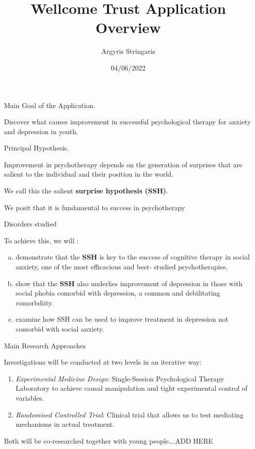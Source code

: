 \documentclass[
  ignorenonframetext,
]{beamer}
\title{Wellcome Trust Application Overview}
\author{Argyris Stringaris}
\date{04/06/2022}
\begin{document}
\frame{\titlepage}

\begin{frame}{Main Goal of the Application.}
\protect\hypertarget{main-goal-of-the-application.}{}

Discover what causes improvement in successful psychological therapy for
anxiety and depression in youth.

\end{frame}

\begin{frame}{Principal Hypothesis.}
\protect\hypertarget{principal-hypothesis.}{}

Improvement in psychotherapy depends on the generation of surprises that
are salient to the individual and their position in the world.

We call this the salient \textbf{surprise hypothesis (SSH)}.

We posit that it is fundamental to success in psychotherapy

\end{frame}

\begin{frame}{Disorders studied}
\protect\hypertarget{disorders-studied}{}

To achieve this, we will :

\begin{enumerate}
[a)]
\item
  demonstrate that the \textbf{SSH} is key to the success of cognitive
  therapy in social anxiety, one of the most efficacious and best-
  studied psychotherapies.
\item
  show that the \textbf{SSH} also underlies improvement of depression in
  those with social phobia comorbid with depression, a common and
  debilitating comorbdiity.
\item
  examine how SSH can be used to improve treatment in depression not
  comorbid with social anxiety.
\end{enumerate}

\end{frame}

\begin{frame}{Main Research Approaches}
\protect\hypertarget{main-research-approaches}{}

Investigations will be conducted at two levels in an iterative way:

\begin{enumerate}
\item
  \emph{Experimental Medicine Design}: Single-Session Psychological
  Therapy Laboratory to achieve causal manipulation and tight
  experimental control of variables.
\item
  \emph{Randomised Controlled Trial}: Clinical trial that allows us to
  test mediating mechanisms in actual treatment.
\end{enumerate}

Both will be co-researched together with young people\ldots.ADD HERE

\end{frame}
\end{document}
